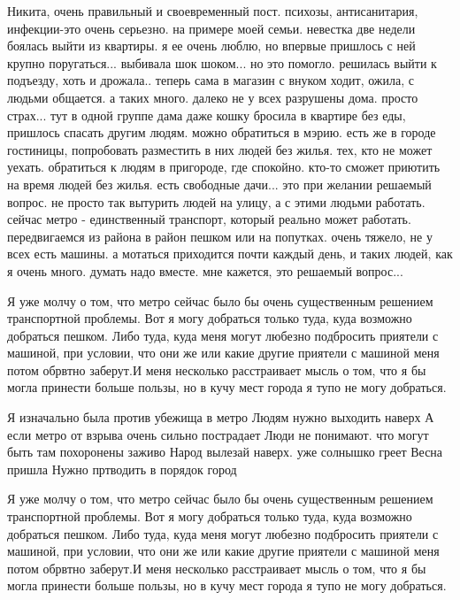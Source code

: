 \begin{itemize}
Никита, очень правильный и своевременный пост. психозы, антисанитария, инфекции-это
очень серьезно. на примере моей семьи. невестка две недели боялась выйти из
квартиры. я ее очень люблю, но впервые пришлось с ней крупно
поругаться... выбивала шок шоком... но это помогло. решилась выйти к подъезду, хоть
и дрожала.. теперь сама в магазин с внуком ходит, ожила, с людьми общается. а таких
много. далеко не у всех разрушены дома. просто страх... тут в одной группе дама
даже кошку бросила в квартире без еды, пришлось спасать другим людям. можно
обратиться в мэрию. есть же в городе гостиницы, попробовать разместить в них
людей без жилья. тех, кто не может уехать. обратиться к людям в пригороде, где
спокойно. кто-то сможет приютить на время людей без жилья. есть свободные
дачи... это при желании решаемый вопрос. не просто так вытурить людей на улицу, а
с этими людьми работать. сейчас метро - единственный транспорт, который реально
может работать. передвигаемся из района в район пешком или на попутках. очень
тяжело, не у всех есть машины. а мотаться приходится почти каждый день, и таких
людей, как я очень много. думать надо вместе. мне кажется, это решаемый вопрос...


Я уже молчу о том, что метро сейчас было бы очень существенным решением
транспортной проблемы. Вот я могу добраться только туда, куда возможно
добраться пешком. Либо туда, куда меня могут любезно подбросить приятели с
машиной, при условии, что они же или какие другие приятели с машиной меня потом
обрвтно заберут.И меня несколько расстраивает мысль о том, что я бы могла
принести больше пользы, но в кучу мест города я тупо не могу добраться.


Я изначально была против убежища в метро Людям нужно выходить наверх А если
метро от взрыва очень сильно пострадает Люди не понимают. что могут быть там
похоронены заживо Народ вылезай наверх. уже солнышко греет Весна пришла Нужно
пртводить в порядок город


Я уже молчу о том, что метро сейчас было бы очень существенным решением
транспортной проблемы. Вот я могу добраться только туда, куда возможно
добраться пешком. Либо туда, куда меня могут любезно подбросить приятели с
машиной, при условии, что они же или какие другие приятели с машиной меня потом
обрвтно заберут.И меня несколько расстраивает мысль о том, что я бы могла
принести больше пользы, но в кучу мест города я тупо не могу добраться.


\end{itemize}
